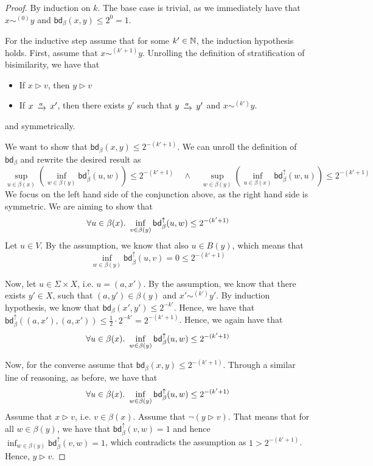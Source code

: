 \begin{proof}
	By induction on $k$. The base case is trivial, as we immediately have that $x \sim^{(0)} y$ and $\mathsf{bd}_\beta(x,y) \leq 2^{0} = 1$.
	
	For the inductive step assume that for some $k' \in \mathbb{N}$, the induction hypothesis holds. First, assume that $x \sim^{(k'+1)} y$. Unrolling the definition of stratification of bisimilarity, we have that
	\begin{itemize}
		\item If $x \rhd v$, then $y \rhd v$
		\item If $x \tr{a} x'$, then there exists $y'$ such that $y \tr{a} y'$ and $x \sim^{(k')} y$.
	\end{itemize}
	and symmetrically.
	
	We want to show that $\mathsf{bd}_\beta(x,y) \leq 2^{-(k'+1)}$. We can unroll the definition of $\mathsf{bd}_\beta$ and rewrite the desired result as
	$$
	\sup_{u \in \beta(x)} \left( \inf_{w \in \beta(y)} \mathsf{bd}_\beta^\uparrow(u,w)\right)  \leq 2^{-(k'+1)}\quad \wedge \quad \sup_{w \in \beta(y)} \left( \inf_{u \in \beta(x)} \mathsf{bd}_\beta^\uparrow(w,u)  \right)\leq 2^{-(k'+1)}
	$$
	We focus on the left hand side of the conjunction above, as the right hand side is symmetric. We are aiming to show that
	$$
	\forall {u \in \beta(x)}\ldotp~\inf_{v \in \beta(y)} \mathsf{bd}_\beta^\uparrow(u,w)  \leq 2^{-(k'+1)} 
	$$
	Let $u \in V$. By the assumption, we know that also $u \in B(y)$, which means that $$\inf_{w \in \beta(y)} \mathsf{bd}_\beta^\uparrow(u,v) = 0 \leq 2^{-(k'+1)}$$
	
	Now, let $u \in \Sigma \times X$, i.e. $u = (a,x')$. By the assumption, we know that there exists $y' \in X$, such that $(a,y') \in \beta(y)$ and $x' \sim^{(k')} y'$. By induction hypothesis, we know that $\mathsf{bd}_{\beta}(x',y') \leq 2^{-k'}$. Hence, we have that $\mathsf{bd}_{\beta}^\uparrow((a,x'),(a,x')) \leq \frac{1}{2} \cdot  2^{-k'} = 2^{-(k'+1)}$. Hence, we again have that 
		$$
		\forall {u \in \beta(x)}\ldotp~\inf_{w \in \beta(y)} \mathsf{bd}_\beta^\uparrow(u,w)  \leq 2^{-(k'+1)} 
		$$
		
		Now, for the converse assume that $\mathsf{bd}_\beta(x,y) \leq 2^{-(k'+1)}$. Through a similar line of reasoning, as before, we have that
		$$
		\forall{u \in \beta(x)}\ldotp~\inf_{w \in \beta(y)} \mathsf{bd}_\beta^\uparrow(u,w) \leq 2^{-(k'+1)} 
		$$
		Assume that $x \rhd v$, i.e. $v \in \beta(x)$. Assume that $\neg (y \rhd v)$. That means that for all $w \in \beta(y)$, we have that $\mathsf{bd}_\beta^\uparrow(v,w) = 1$ and hence $\inf_{w \in \beta(y)} \mathsf{bd}_\beta^\uparrow(v,w)=1$, which contradicts the assumption as $1>2^{-{(k'+1)}}$. Hence, $y \rhd v$.
		

\end{proof}
